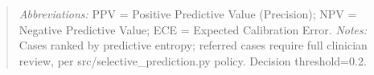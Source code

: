 \begin{table}[htbp]
\end{table}


\begin{quote}\small
\textit{Abbreviations:} PPV = Positive Predictive Value (Precision); NPV = Negative Predictive Value; ECE = Expected Calibration Error.
\textit{Notes:} Cases ranked by predictive entropy; referred cases require full clinician review, per src/selective_prediction.py policy. Decision threshold=0.2.
\end{quote}